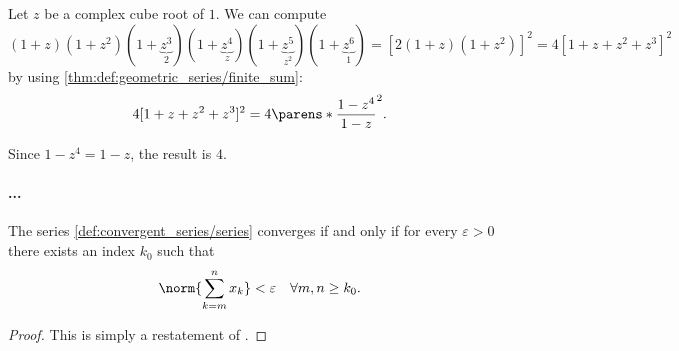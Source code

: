 \begin{example}
\begin{thmenum}
     Let \( z \) be a complex cube root of \( 1 \). We can compute
    \begin{equation*}
      (1 + z) (1 + z^2) (1 + \underbrace{z^3}_2) (1 + \underbrace{z^4}_z) (1 + \underbrace{z^5}_{z^2}) (1 + \underbrace{z^6}_1)
      =
      [2 (1 + z) (1 + z^2)]^2
      =
      4 [1 + z + z^2 + z^3]^2
    \end{equation*}
    by using \cref{thm:def:geometric_series/finite_sum}:
    \begin{equation*}
      4 [1 + z + z^2 + z^3]^2
      =
      4 \parens*{ \frac {1 - z^4} {1 - z} }^2.
    \end{equation*}

    Since \( 1 - z^4 = 1 - z \), the result is \( 4 \).
  \end{thmenum}
\end{example}

\paragraph{...}

\begin{proposition}\label{thm:cauchy_series_convergence_criterion}
  The series \eqref{def:convergent_series/series} converges if and only if for every \( \varepsilon > 0 \) there exists an index \( k_0 \) such that
  \begin{equation*}
    \norm{\sum_{k=m}^n x_k} < \varepsilon \quad\forall m, n \geq k_0.
  \end{equation*}
\end{proposition}
\begin{proof}
  This is simply a restatement of .
\end{proof}


